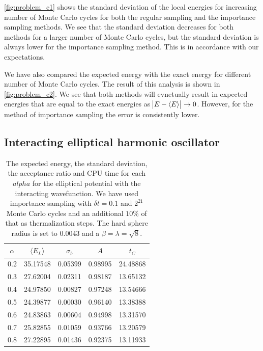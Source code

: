 \documentclass[
    a4paper, aps, twocolumn, floatfix, superscriptaddress, nofootinbib]{revtex4-1}
\newcommand{\1}{\mathds{1}}
\begin{document}
	\autoref{fig:problem_c1} shows the standard deviation of the local energies for increasing number of Monte
	Carlo cycles for both the regular sampling and the importance sampling methods. We see that the standard 
	deviation decreases for both methods for a larger number of Monte Carlo cycles, but the standard deviation
	is always lower for the importance sampling method. This is in accordance with our expectations.
	
	We have also compared the expected energy with the exact energy for different number of Monte Carlo
	cycles. The result of this analysis is shown in \autoref{fig:problem_c2}. We see that both methods will  evnetually 
	result in expected energies that are equal to the exact energies as $\abs{E - \expval{E}} \to 0$. However, for the 
	method of importance sampling the error is consistently lower. 

\subsection{Interacting elliptical harmonic oscillator}
         \begin{table}
             \caption{The expected energy, the standard
             deviation, the acceptance ratio and CPU time for each $alpha$
             for the elliptical potential with the interacting wavefunction. We
             have used importance sampling with $\delta t = 0.1$ and $2^{21}$
             Monte Carlo cycles and an additional $10\%$ of that as
             thermalization steps. The hard sphere radius is set to $0.0043$ and
             a $\beta = \lambda = \sqrt{8}$.}
             \centering
             \begin{ruledtabular}
                 \begin{tabular}{ccccc}
                     $\alpha$ & $\langle  E_L\rangle$ & $\sigma_b$
                     &$A$&$t_C$ \\
                     \hline
                     0.2&35.17548&0.05399&0.98995&24.48868\\
                     0.3&27.62004&0.02311&0.98187&13.65132\\
                     0.4&24.97850&0.00827&0.97248&13.54666\\
                     0.5&24.39877&0.00030&0.96140&13.38388\\
                     0.6&24.83863&0.00604&0.94998&13.31570\\
                     0.7&25.82855&0.01059&0.93766&13.20579\\
                     0.8&27.22895&0.01436&0.92375&13.11933\\
                 \end{tabular}
             \end{ruledtabular}
             \label{tab:10_interacting}
         \end{table}
 
\end{document}
